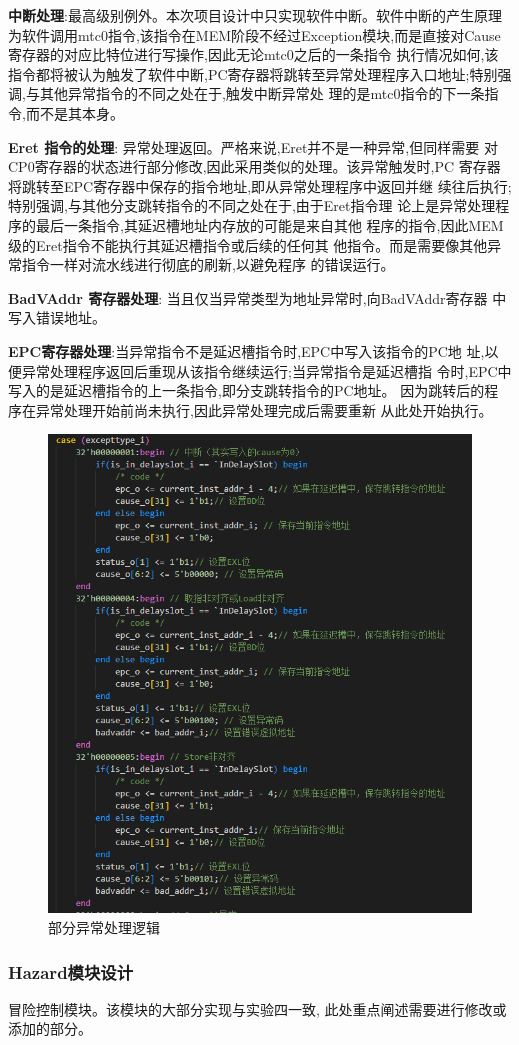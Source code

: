 \textbf{中断处理}:最高级别例外。本次项目设计中只实现软件中断。软件中断的产生原理为软件调用mtc0指令,该指令在MEM阶段不经过Exception模块,而是直接对Cause寄存器的对应比特位进行写操作,因此无论mtc0之后的一条指令 执行情况如何,该指令都将被认为触发了软件中断,PC寄存器将跳转至异常处理程序入口地址;特别强调,与其他异常指令的不同之处在于,触发中断异常处 理的是mtc0指令的下一条指令,而不是其本身。 

\textbf{Eret 指令的处理}: 异常处理返回。严格来说,Eret并不是一种异常,但同样需要 对CP0寄存器的状态进行部分修改,因此采用类似的处理。该异常触发时,PC 寄存器将跳转至EPC寄存器中保存的指令地址,即从异常处理程序中返回并继 续往后执行;特别强调,与其他分支跳转指令的不同之处在于,由于Eret指令理 论上是异常处理程序的最后一条指令,其延迟槽地址内存放的可能是来自其他 程序的指令,因此MEM级的Eret指令不能执行其延迟槽指令或后续的任何其 他指令。而是需要像其他异常指令一样对流水线进行彻底的刷新,以避免程序 的错误运行。 

\textbf{BadVAddr 寄存器处理}: 当且仅当异常类型为地址异常时,向BadVAddr寄存器 中写入错误地址。

\textbf{EPC寄存器处理}:当异常指令不是延迟槽指令时,EPC中写入该指令的PC地 址,以便异常处理程序返回后重现从该指令继续运行;当异常指令是延迟槽指 令时,EPC中写入的是延迟槽指令的上一条指令,即分支跳转指令的PC地址。 因为跳转后的程序在异常处理开始前尚未执行,因此异常处理完成后需要重新 从此处开始执行。 
\begin{figure}
\centering
\includegraphics[width=0.5\linewidth]{image/p8.png}
\caption{部分异常处理逻辑}
\label{fig:enter-label}
\end{figure}

\subsubsection{Hazard模块设计}
冒险控制模块。该模块的大部分实现与实验四一致, 此处重点阐述需要进行修改或添加的部分。

